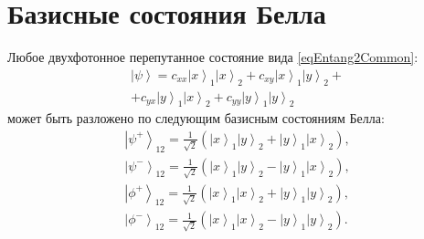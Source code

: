 \section{Базисные состояния Белла}

Любое двухфотонное перепутанное состояние вида \eqref{eqEntang2Common}:
\begin{eqnarray}
\left|\psi\right> =  
c_{xx} \left|x\right>_1\left|x\right>_2 +
c_{xy} \left|x\right>_1\left|y\right>_2 +
\nonumber \\
+
c_{yx} \left|y\right>_1\left|x\right>_2 +
c_{yy} \left|y\right>_1\left|y\right>_2
\nonumber
\end{eqnarray}
может быть разложено по следующим базисным состояниям Белла:
\begin{eqnarray}
  \left|\psi^{+}\right>_{12} = 
  \frac{1}{\sqrt{2}}\left(
  \left|x\right>_1\left|y\right>_2 + 
  \left|y\right>_1\left|x\right>_2
  \right),
  \nonumber \\
  \left|\psi^{-}\right>_{12} = 
  \frac{1}{\sqrt{2}}\left(
  \left|x\right>_1\left|y\right>_2 - 
  \left|y\right>_1\left|x\right>_2
  \right),
  \nonumber \\
  \left|\phi^{+}\right>_{12} = 
  \frac{1}{\sqrt{2}}\left(
  \left|x\right>_1\left|x\right>_2 + 
  \left|y\right>_1\left|y\right>_2
  \right),
  \nonumber \\
  \left|\phi^{-}\right>_{12} = 
  \frac{1}{\sqrt{2}}\left(
  \left|x\right>_1\left|x\right>_2 - 
  \left|y\right>_1\left|y\right>_2
  \right).
  \label{eqEntangBellBase}
\end{eqnarray}
 
